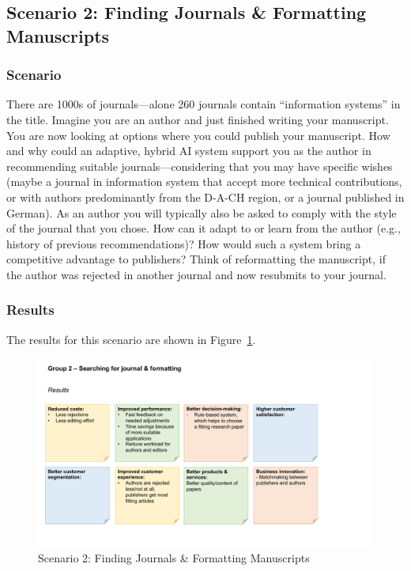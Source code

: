 \newpage
\subsection{Scenario 2: Finding Journals \& Formatting Manuscripts}

\subsubsection*{Scenario}

There are 1000s of journals---alone 260 journals contain “information systems” in the title. Imagine
you are an author and just finished writing your manuscript. You are now looking at options where you
could publish your manuscript. How and why could an adaptive, hybrid AI system support you as the author
in recommending suitable journals---considering that you may have specific wishes (maybe a journal in
information system that accept more technical contributions, or with authors predominantly from the D-A-CH
region, or a journal published in German). As an author you will typically also be asked to comply with the
style of the journal that you chose. How can it adapt to or learn from the author (e.g., history of previous
recommendations)? How would such a system bring a competitive advantage to publishers? Think of reformatting
the manuscript, if the author was rejected in another journal and now resubmits to your journal.

\subsubsection*{Results}

The results for this scenario are shown in Figure~\ref{fig:appendix:fig2}.

\begin{figure}[h!]
    \centering
    \caption{Scenario 2: Finding Journals \& Formatting Manuscripts}
    \label{fig:appendix:fig2}
    \includegraphics[width=\textwidth]{figures/results_2.pdf}
\end{figure}


